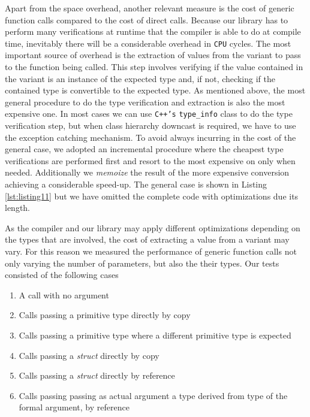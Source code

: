 Apart from the space overhead, another relevant measure is the cost of generic function calls compared to the cost of direct calls.
Because our library has to perform many verifications at runtime that the compiler is able to do at compile time, inevitably there will be a
considerable overhead in \texttt{CPU} cycles. The most important source of overhead is the extraction of values from the variant to pass
to the function being called. This step involves verifying if the value contained in the variant is an instance of the expected type and, if not,
checking if the contained type is convertible to the expected type. As mentioned above, the most general procedure to do the type verification
and extraction is also the most expensive one. In most cases we can use \texttt{C++'s} \texttt{type\_info} class to do the type verification
step, but when class hierarchy downcast is required, we have to use the exception catching mechanism.
To avoid always incurring in the cost of the general case, we adopted an incremental procedure where the cheapest type verifications are performed
first and resort to the most expensive on only when needed. Additionally we \emph{memoize} the result of the more expensive conversion
achieving a considerable speed-up. The general case is shown in Listing \ref{lst:listing11} but we have omitted the complete code
with optimizations due its length.

As the compiler and our library may apply different optimizations depending on the types that are involved, the cost of extracting a value
from a variant may vary. For this reason we measured the performance of generic function calls not only varying the number of parameters, but
also the their types. Our tests consisted of the following cases

\begin{enumerate}
 \item A call with no argument
 \item Calls passing a primitive type directly by copy
 \item Calls passing a primitive type where a different primitive type is expected
 \item Calls passing a \emph{struct} directly by copy
 \item Calls passing a \emph{struct} directly by reference 
 \item Calls passing passing as actual argument a type derived from type of the formal argument, by reference
\end{enumerate}

